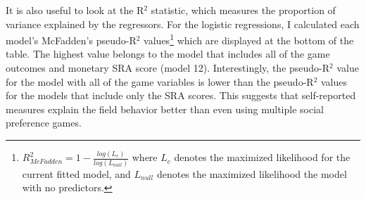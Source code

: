 \documentclass[12pt]{article}
\begin{document}

It is also useful to look at the R$^{2}$ statistic, which measures the proportion of variance explained by the regressors. For the logistic regressions, I calculated each model\rq s McFadden\rq s pseudo-R$^{2}$ values\footnote{
\(R^{2}_{McFadden} = 1 - \frac{log(L_{c})}{log(L_{null})}\)
where \(L_{c}\) denotes the maximized likelihood for the current fitted model, and \(L_{null}\) denotes the maximized likelihood the model with no predictors.
} which are displayed at the bottom of the table. The highest value belongs to the model that includes all of the game outcomes and monetary SRA score (model 12). Interestingly, the pseudo-R$^{2}$ value for the model with all of the game variables is lower than the pseudo-R$^{2}$ values for the models that include only the SRA scores. This suggests that self-reported measures explain the field behavior better than even using multiple social preference games. 
\end{document}
